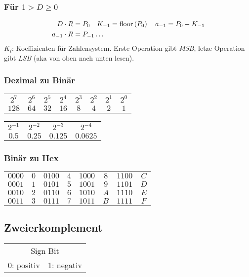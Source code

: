 \subsubsection{Für $1 > D \geq 0$}
\begin{align*}
    D \cdot R &= P_0 \quad K_{-1} = \text{floor}\left(P_0\right) \quad a_{-1} = P_0 - K_{-1}\\ 
    a_{-1} \cdot R &= P_{-1} \dots
\end{align*}
$K_i$: Koeffizienten für Zahlensystem. Erste Operation gibt \emph{MSB}, letze Operation gibt \emph{LSB} (aka von oben nach unten lesen).

\subsubsection{Dezimal zu Binär}
\begin{center}
    \begin{tabular}{c|c|c|c|c|c|c|c}
        $2^7$ & $2^6$ & $2^5$ & $2^4$ & $2^3$ & $2^2$ & $2^1$ & $2^0$\\
        $128$ & $64$ & $32$ & $16$ & $8$ & $4$ & $2$ & $1$
    \end{tabular}
\end{center}
\begin{center}
    \begin{tabular}{c|c|c|c}
        $2^{-1}$ & $2^{-2}$ & $2^{-3}$ & $2^{-4}$\\
        $0.5$ & $0.25$ & $0.125$ & $0.0625$
    \end{tabular}
\end{center}

\subsubsection{Binär zu Hex}
\begin{center}
    \begin{tabular}{c c||c c||c c||c c}
        $0000$ & $0$ & $0100$ & $4$ & $1000$ & $8$ & $1100$ & $C$\\
        $0001$ & $1$ & $0101$ & $5$ & $1001$ & $9$ & $1101$ & $D$\\
        $0010$ & $2$ & $0110$ & $6$ & $1010$ & $A$ & $1110$ & $E$\\
        $0011$ & $3$ & $0111$ & $7$ & $1011$ & $B$ & $1111$ & $F$\\
    \end{tabular}
\end{center}
\subsection{Zweierkomplement}
\begin{center}
    \begin{tabular}{c c}
        \multicolumn{2}{c}{Sign Bit}\\
        0: positiv & 1: negativ
    \end{tabular}
\end{center}
